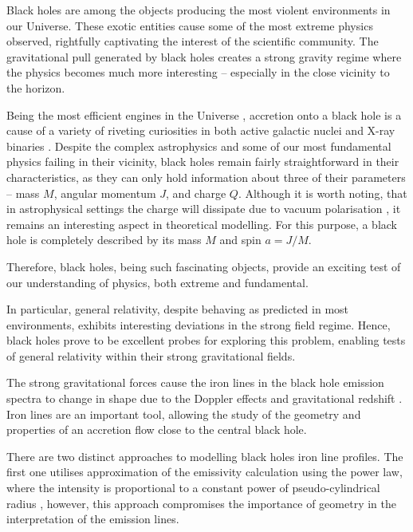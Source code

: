 \documentclass[fleqn,usenatbib,useAMS]{mnras}
\begin{document}
Black holes are among the objects producing the most violent environments in our Universe. These exotic entities cause some of the most extreme physics observed, rightfully captivating the interest of the scientific community. The gravitational pull generated by black holes creates a strong gravity regime where the physics becomes much more interesting -- especially in the close vicinity to the horizon. 

Being the most efficient engines in the Universe \cite{rees1984black}, accretion onto a black hole is a cause of a variety of riveting curiosities in both active galactic nuclei and X-ray binaries \cite{taylor2018exploring}. Despite the complex astrophysics and some of our most fundamental physics failing in their vicinity, black holes remain fairly straightforward in their characteristics, as they can only hold information about three of their parameters -- mass $M$, angular momentum $J$, and charge $Q$. Although it is worth noting, that in astrophysical settings the charge will dissipate due to vacuum polarisation \cite{reynolds2003fluorescent}, it remains an interesting aspect in theoretical modelling. For this purpose, a black hole is completely described by its mass $M$ and spin $a = J/M$.

Therefore, black holes, being such fascinating objects, provide an exciting test of our understanding of physics, both extreme and fundamental. 

In particular, general relativity, despite behaving as predicted in most environments, exhibits interesting deviations in the strong field regime. Hence, black holes prove to be excellent probes for exploring this problem, enabling tests of general relativity within their strong gravitational fields.

The strong gravitational forces cause the iron lines in the black hole emission spectra to change in shape due to the Doppler effects and gravitational redshift \cite{fabian2000broad}. Iron lines are an important tool, allowing the study of the geometry and properties of an accretion flow close to the central black hole. 

There are two distinct approaches to modelling black holes iron line profiles. The first one utilises approximation of the emissivity calculation using the power law, where the intensity is proportional to a constant power of pseudo-cylindrical radius \cite{abdikamalov2020testing}, however, this approach compromises the importance of geometry in the interpretation of the emission lines.
\end{document}
